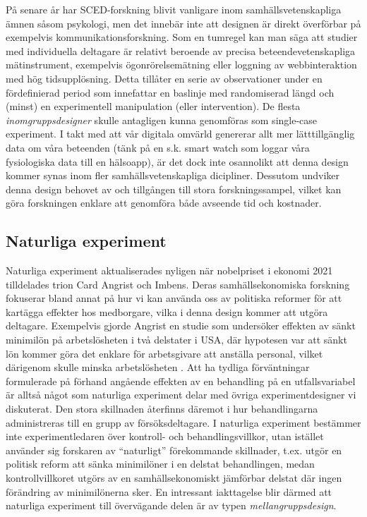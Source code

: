 \documentclass[
]{book}
\begin{document}
På senare år har SCED-forskning blivit vanligare inom samhällsvetenskapliga ämnen såsom psykologi, men det innebär inte att designen är direkt överförbar på exempelvis kommunikationsforskning. Som en tumregel kan man säga att studier med individuella deltagare är relativt beroende av precisa beteendevetenskapliga mätinstrument, exempelvis ögonrörelsemätning eller loggning av webbinteraktion med hög tidsupplösning. Detta tillåter en serie av observationer under en fördefinierad period som innefattar en baslinje med randomiserad längd och (minst) en experimentell manipulation (eller intervention). De flesta \emph{inomgruppsdesigner} skulle antagligen kunna genomföras som single-case experiment. I takt med att vår digitala omvärld genererar allt mer lätttillgänglig data om våra beteenden (tänk på en s.k. smart watch som loggar våra fysiologiska data till en hälsoapp), är det dock inte osannolikt att denna design kommer synas inom fler samhällsvetenskapliga dicipliner. Dessutom undviker denna design behovet av och tillgången till stora forskningssampel, vilket kan göra forskningen enklare att genomföra både avseende tid och kostnader.

\hypertarget{sub07.5.8}{%
\subsection{Naturliga experiment}\label{sub07.5.8}}

Naturliga experiment aktualiserades nyligen när nobelpriset i ekonomi 2021 tilldelades trion Card Angrist och Imbens. Deras samhällsekonomiska forskning fokuserar bland annat på hur vi kan använda oss av politiska reformer för att kartägga effekter hos medborgare, vilka i denna design kommer att utgöra deltagare. Exempelvis gjorde Angrist en studie som undersöker effekten av sänkt minimilön på arbetslösheten i två delstater i USA, där hypotesen var att sänkt lön kommer göra det enklare för arbetsgivare att anställa personal, vilket därigenom skulle minska arbetslösheten \citep{angrist1990lifetime, card1994comment}. Att ha tydliga förväntningar formulerade på förhand angående effekten av en behandling på en utfallsvariabel är alltså något som naturliga experiment delar med övriga experimentdesigner vi diskuterat. Den stora skillnaden återfinns däremot i hur behandlingarna administreras till en grupp av försöksdeltagare. I naturliga experiment bestämmer inte experimentledaren över kontroll- och behandlingsvillkor, utan istället använder sig forskaren av ``naturligt'' förekommande skillnader, t.ex. utgör en politisk reform att sänka minimilöner i en delstat behandlingen, medan kontrollvillkoret utgörs av en samhällsekonomiskt jämförbar delstat där ingen förändring av minimilönerna sker. En intressant iakttagelse blir därmed att naturliga experiment till övervägande delen är av typen \emph{mellangruppsdesign}.
\end{document}
